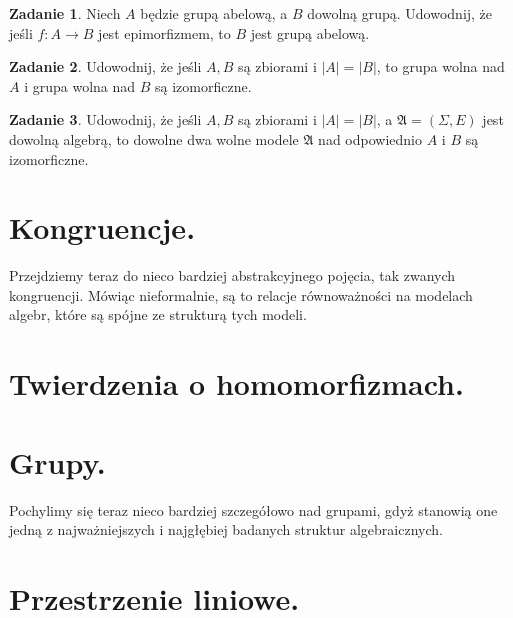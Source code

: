 \documentclass{article}
\theoremstyle{definition}
\newtheorem{exercise}{Zadanie}[section]
\begin{document}
\begin{exercise}
	Niech $A$ będzie grupą abelową, a $B$ dowolną grupą.
	Udowodnij, że jeśli $f: A \to B$ jest epimorfizmem,
		to $B$ jest grupą abelową.
\end{exercise}

\begin{exercise}
	Udowodnij, że jeśli $A, B$ są zbiorami i $|A| = |B|$,
		to grupa wolna nad $A$ i grupa wolna nad $B$ są izomorficzne.
\end{exercise}

\begin{exercise}
	Udowodnij, że jeśli $A, B$ są zbiorami i $|A| = |B|$,
		a $\mathfrak{A} = (\Sigma, E)$ jest dowolną algebrą,
		to dowolne dwa wolne modele $\mathfrak{A}$ nad odpowiednio $A$ i $B$ są izomorficzne.
\end{exercise}

\section{Kongruencje.}
Przejdziemy teraz do nieco bardziej abstrakcyjnego pojęcia,
	tak zwanych kongruencji.
Mówiąc nieformalnie,
	są to relacje równoważności na modelach algebr,
	które są spójne ze strukturą tych modeli.



\section{Twierdzenia o homomorfizmach.}

\section{Grupy.}

Pochylimy się teraz nieco bardziej szczegółowo nad grupami,
gdyż stanowią one jedną z najważniejszych i najgłębiej badanych struktur algebraicznych.



\section{Przestrzenie liniowe.}
\end{document}
